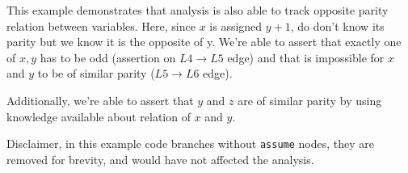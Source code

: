 This example demonstrates that analysis is also able to track opposite
parity relation between variables. Here, since $x$ is assigned $y + 1$,
do don't know its parity but we know it is the opposite of y. We're able
to assert that exactly one of $x,y$ has to be odd (assertion on
$L4\rightarrow L5$ edge) and that is impossible for $x$ and $y$ to be of
similar parity ($L5\rightarrow L6$ edge).

Additionally, we're able to assert that $y$ and $z$ are of similar parity
by using knowledge available about relation of $x$ and $y$.

Disclaimer, in this example code branches without \texttt{assume} nodes,
they are removed for brevity, and would have not affected the analysis.
